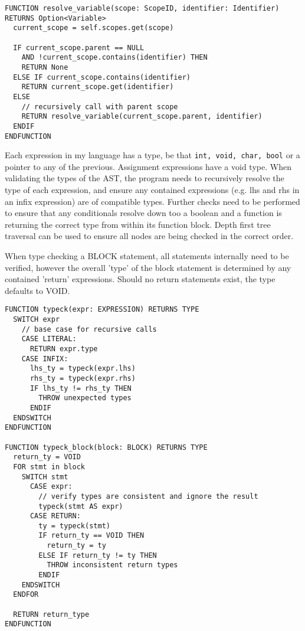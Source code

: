 \begin{lstlisting}
FUNCTION resolve_variable(scope: ScopeID, identifier: Identifier) RETURNS Option<Variable>
  current_scope = self.scopes.get(scope)

  IF current_scope.parent == NULL 
    AND !current_scope.contains(identifier) THEN
    RETURN None
  ELSE IF current_scope.contains(identifier)
    RETURN current_scope.get(identifier)
  ELSE 
    // recursively call with parent scope
    RETURN resolve_variable(current_scope.parent, identifier)
  ENDIF
ENDFUNCTION
\end{lstlisting}

Each expression in my language has a type, be that \texttt{int, void, char, bool} or a pointer to any of the previous. Assignment expressions have a void type. When validating the types of the AST, the program needs to recursively resolve the type of each expression, and ensure any contained expressions (e.g. lhs and rhs in an infix expression) are of compatible types. Further checks need to be performed to ensure that any conditionals resolve down too a boolean and a function is returning the correct type from within its function block. Depth first tree traversal can be used to ensure all nodes are being checked in the correct order.

When type checking a BLOCK statement, all statements internally need to be verified, however the overall 'type' of the block statement is determined by any contained 'return' expressions. Should no return statements exist, the type defaults to VOID.

\begin{lstlisting}
FUNCTION typeck(expr: EXPRESSION) RETURNS TYPE
  SWITCH expr 
    // base case for recursive calls
    CASE LITERAL: 
      RETURN expr.type
    CASE INFIX:
      lhs_ty = typeck(expr.lhs)
      rhs_ty = typeck(expr.rhs)
      IF lhs_ty != rhs_ty THEN 
        THROW unexpected types
      ENDIF 
  ENDSWITCH
ENDFUNCTION

FUNCTION typeck_block(block: BLOCK) RETURNS TYPE
  return_ty = VOID
  FOR stmt in block 
    SWITCH stmt 
      CASE expr: 
        // verify types are consistent and ignore the result
        typeck(stmt AS expr)
      CASE RETURN:
        ty = typeck(stmt)
        IF return_ty == VOID THEN
          return_ty = ty 
        ELSE IF return_ty != ty THEN 
          THROW inconsistent return types
        ENDIF
    ENDSWITCH
  ENDFOR

  RETURN return_type 
ENDFUNCTION
\end{lstlisting}

